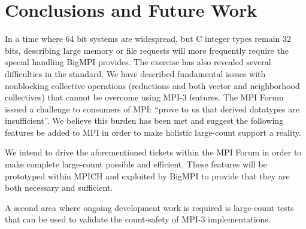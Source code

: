 
\section{Conclusions and Future Work}

In a time where 64 bit systems are widespread,
but C integer types remain 32 bits, describing large memory or file requests
will more frequently require the special handling BigMPI provides.
The exercise has also revealed several difficulties in the standard.
We have described fundamental issues with nonblocking
collective operations (reductions and both vector and neighborhood collectives)
that cannot be overcome using MPI-3 features.
The MPI Forum issued a challenge to consumers of MPI:
``prove to us that derived datatypes are insufficient''.
We believe this burden has been met and suggest the following features
be added to MPI in order to make holistic large-count support a reality.

We intend to drive the aforementioned tickets within the MPI Forum
in order to make complete large-count possible and efficient.
These features will be prototyped within MPICH and exploited by
BigMPI to provide that they are both necessary and sufficient.

A second area where ongoing development work is required is 
large-count tests that can be used to validate the count-safety of
MPI-3 implementations.  
